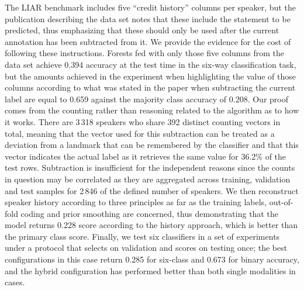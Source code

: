 The LIAR benchmark includes five ``credit history'' columns per speaker, but the
publication describing the data set notes that these include the statement to be
predicted, thus emphasizing that these should only be used after the current
annotation has been subtracted from it. We provide the evidence for the cost of
following these instructions. Forests fed with only those five columns from the
data set achieve 0.394 accuracy at the test time in the six-way classification
task, but the amounts achieved in the experiment when highlighting the value of
those columns according to what was stated in the paper when subtracting the
current label are equal to 0.659 against the majority class accuracy of 0.208.
Our proof comes from the counting rather than reasoning related to the algorithm
as to how it works. There are 3\,318 speakers who share 392 distinct counting
vectors in total, meaning that the vector used for this subtraction can be
treated as a deviation from a landmark that can be remembered by the classifier
and that this vector indicates the actual label as it retrieves the same value
for 36.2\% of the test rows. Subtraction is insufficient for the independent
reasons since the counts in question may be correlated as they are aggregated
across training, validation and test samples for 2\,846 of the defined number of
speakers. We then reconstruct speaker history according to three principles as
far as the training labels, out-of-fold coding and prior smoothing are
concerned, thus demonstrating that the model returns 0.228 score according to
the history approach, which is better than the primary class score. Finally, we
test six classifiers in a set of experiments under a protocol that selects on
validation and scores on testing once; the best configurations in this case
return 0.285 for six-class and 0.673 for binary accuracy, and the hybrid
configuration has performed better than both single modalities in cases.
